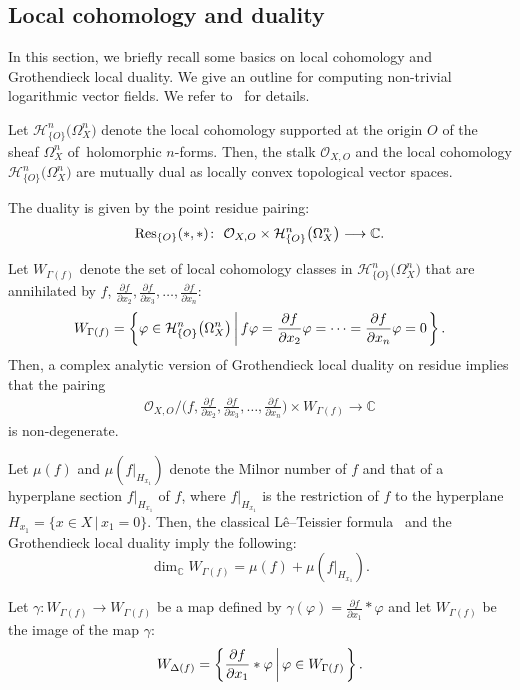 \documentclass[10pt,a4paper]{amsart}
\numberwithin{equation}{section}
\newcommand{\Set}[1]{\left\{#1\right\}}
\newcommand{\setDef}[2]{{#1}\left|\,\vphantom{#1}{#2}\right.}%
\newcommand{\SetDef}[2]{\Set{\setDef{#1}{#2}}}
\begin{document}


\subsection{Local cohomology and duality}

In this section, we briefly recall some basics on local cohomology and Grothendieck local duality. We give an outline for computing
non-trivial logarithmic vector fields. We refer to~\cite{TN20} for details.

Let ${\mathcal H}_{\{O\}}^n\big(\Omega_X^n\big)$ denote the local cohomology supported at the origin $O$ of the sheaf $\Omega_X^n$ of~holo\-morphic $n$-forms. Then, the stalk ${\mathcal O}_{X, O}$ and the local cohomology ${\mathcal H}_{\{O\}}^n\big(\Omega_X^n\big)$ are mutually dual as locally convex topological vector spaces.

The duality is given by the point residue pairing:
\[
{\rm Res}_{\{O\}}(*, *)\colon\ {\mathcal O}_{X,O} \times {\mathcal H}_{\{O\}}^n\big(\Omega_X^n\big) \longrightarrow {\mathbb C}.
\]

Let $W_{\Gamma(f)}$ denote the set of local cohomology classes in ${\mathcal H}_{\{O\}}^n\big(\Omega_X^n\big)$ that are annihilated by
$f$, $\frac{\partial f}{\partial x_2}, \frac{\partial f}{\partial x_{3}}, \dots, \frac{\partial f}{\partial x_{n}}$:
\[
W_{\Gamma(f)} = \SetDef{ \varphi \in {\mathcal H}_{\{O\}}^n\big(\Omega_X^n\big)}{f\varphi = \frac{\partial f}{\partial x_2}\varphi = \cdots = \frac{\partial f}{\partial x_{n}}\varphi = 0}.
\]
Then, a complex analytic version of Grothendieck local duality on residue implies that the pairing
\begin{gather*}
{\mathcal O}_{X,O}\Big/\bigg(f, \frac{\partial f}{\partial x_2}, \frac{\partial f}{\partial x_3},\ldots,\frac{\partial f}{\partial x_{n}}\bigg) \times W_{\Gamma(f)} \longrightarrow {\mathbb C}
\end{gather*}
is non-degenerate.

Let $\mu(f)$ and $\mu(f|_{H_{x_1}})$ denote the Milnor number of $f$ and that of a hyperplane section $f|_{H_{x_1}}$ of $f$, where $f|_{H_{x_1}}$ is the restriction of $f$ to the hyperplane $H_{x_1} =\{ x \in X \,|\, x_1=0\}$. Then, the classical L\^e--Teissier formula~\cite{L,Te73} and the Grothendieck local duality imply the following:
\[
\dim_{{\mathbb C}}W_{\Gamma(f)} = \mu(f) + \mu(f|_{H_{x_1}}).
\]

Let $\gamma\colon W_{\Gamma(f)} \longrightarrow W_{\Gamma(f)}$ be a map defined by
$\gamma(\varphi)=\frac{\partial f}{\partial x_1}\ast\varphi$ and let $W_{\Gamma(f)}$ be the image of the map $\gamma$:
\[
W_{\Delta(f)} = \SetDef{ \frac{\partial f}{\partial x_1}\ast\varphi}{\varphi \in W_{\Gamma(f)}}.
\]
\end{document}
